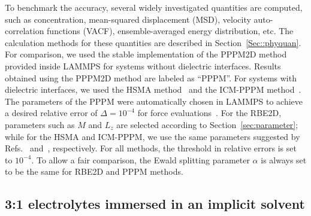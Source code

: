 To benchmark the accuracy, several widely investigated quantities are computed, such as concentration, mean-squared displacement (MSD), velocity auto-correlation functions (VACF), ensemble-averaged energy distribution, etc. 
The calculation methods for these quantities are described in Section~\ref{Sec::phyquan}.
For comparison, we used the stable implementation of the PPPM2D method~\cite{crozier2001molecular} provided inside LAMMPS for systems without dielectric interfaces.
Results obtained using the PPPM2D method are labeled as ``PPPM''. 
For systems with dielectric interfaces, we used the HSMA method~\cite{liang2020harmonic} and the ICM-PPPM method~\cite{yuan2021particle}.
The parameters of the PPPM were automatically chosen in LAMMPS to achieve a desired relative error of $\Delta=10^{-4}$ for force evaluations~\cite{deserno1998mesh}. 
For the RBE2D, parameters such as $M$ and $L_z$ are selected according to Section~\ref{sec:parameter}; while
for the HSMA and ICM-PPPM, we use the same parameters suggested by Refs.~\cite{liang2020harmonic} and~\cite{yuan2021particle}, respectively. For all methods, the threshold in relative errors is set to $10^{-4}$.
To allow a fair comparison, the Ewald splitting parameter $\alpha$ is always set to be the same for RBE2D and PPPM methods.



\subsection{3:1 electrolytes immersed in an implicit solvent}\label{subsec::electrolyte-neutral}

